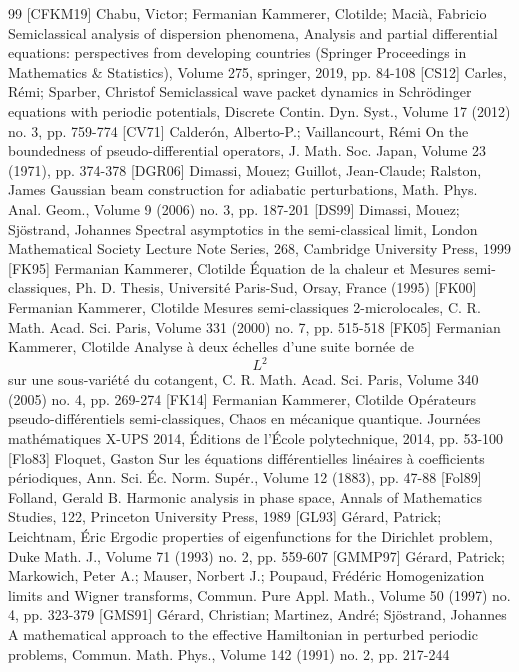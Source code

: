 \documentclass[10pt]{amsart}
\theoremstyle{definition}
\numberwithin{equation}{section}
\begin{document}
\begin{thebibliography}{99}
 [CFKM19] Chabu, Victor; Fermanian Kammerer, Clotilde; Macià, Fabricio Semiclassical analysis of dispersion phenomena, Analysis and partial differential equations: perspectives from developing countries (Springer Proceedings in Mathematics \& Statistics), Volume 275, springer, 2019, pp. 84-108
 [CS12] Carles, Rémi; Sparber, Christof Semiclassical wave packet dynamics in Schrödinger equations with periodic potentials, Discrete Contin. Dyn. Syst., Volume 17 (2012) no. 3, pp. 759-774
 [CV71] Calderón, Alberto-P.; Vaillancourt, Rémi On the boundedness of pseudo-differential operators, J. Math. Soc. Japan, Volume 23 (1971), pp. 374-378
 [DGR06] Dimassi, Mouez; Guillot, Jean-Claude; Ralston, James Gaussian beam construction for adiabatic perturbations, Math. Phys. Anal. Geom., Volume 9 (2006) no. 3, pp. 187-201
 [DS99] Dimassi, Mouez; Sjöstrand, Johannes Spectral asymptotics in the semi-classical limit, London Mathematical Society Lecture Note Series, 268, Cambridge University Press, 1999
 [FK95] Fermanian Kammerer, Clotilde Équation de la chaleur et Mesures semi-classiques, Ph. D. Thesis, Université Paris-Sud, Orsay, France (1995)
 [FK00] Fermanian Kammerer, Clotilde Mesures semi-classiques 2-microlocales, C. R. Math. Acad. Sci. Paris, Volume 331 (2000) no. 7, pp. 515-518
 [FK05] Fermanian Kammerer, Clotilde Analyse à deux échelles d’une suite bornée de $${L}^2$$ sur une sous-variété du cotangent, C. R. Math. Acad. Sci. Paris, Volume 340 (2005) no. 4, pp. 269-274
 [FK14] Fermanian Kammerer, Clotilde Opérateurs pseudo-différentiels semi-classiques, Chaos en mécanique quantique. Journées mathématiques X-UPS 2014, Éditions de l’École polytechnique, 2014, pp. 53-100
 [Flo83] Floquet, Gaston Sur les équations différentielles linéaires à coefficients périodiques, Ann. Sci. Éc. Norm. Supér., Volume 12 (1883), pp. 47-88
 [Fol89] Folland, Gerald B. Harmonic analysis in phase space, Annals of Mathematics Studies, 122, Princeton University Press, 1989
 [GL93] Gérard, Patrick; Leichtnam, Éric Ergodic properties of eigenfunctions for the Dirichlet problem, Duke Math. J., Volume 71 (1993) no. 2, pp. 559-607
 [GMMP97] Gérard, Patrick; Markowich, Peter A.; Mauser, Norbert J.; Poupaud, Frédéric Homogenization limits and Wigner transforms, Commun. Pure Appl. Math., Volume 50 (1997) no. 4, pp. 323-379
 [GMS91] Gérard, Christian; Martinez, André; Sjöstrand, Johannes A mathematical approach to the effective Hamiltonian in perturbed periodic problems, Commun. Math. Phys., Volume 142 (1991) no. 2, pp. 217-244

\end{thebibliography}
\end{document}
